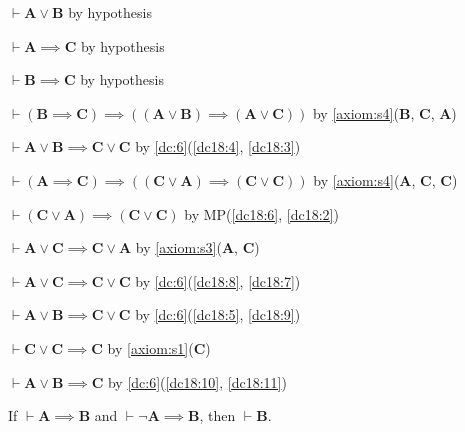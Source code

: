 \documentclass{amsart}%
\newcommand\metavariable[1]{\boldsymbol{#1}}
\begin{document}
\begin{pf}
\item\label{dc18:1} $\vdash\metavariable{A}\lor\metavariable{B}$ by hypothesis
\item\label{dc18:2} $\vdash\metavariable{A}\implies\metavariable{C}$ by hypothesis
\item\label{dc18:3} $\vdash\metavariable{B}\implies\metavariable{C}$ by hypothesis
\item\label{dc18:4} $\vdash(\metavariable{B}\implies\metavariable{C})\implies((\metavariable{A}\lor\metavariable{B})\implies(\metavariable{A}\lor\metavariable{C}))$
  by \ref{axiom:s4}($\metavariable{B}$, $\metavariable{C}$, $\metavariable{A}$)
\item\label{dc18:5} $\vdash\metavariable{A}\lor\metavariable{B}\implies\metavariable{C}\lor\metavariable{C}$
  by \ref{dc:6}(\ref{dc18:4}, \ref{dc18:3})
\item\label{dc18:6} $\vdash(\metavariable{A}\implies\metavariable{C})\implies((\metavariable{C}\lor\metavariable{A})\implies(\metavariable{C}\lor\metavariable{C}))$
  by \ref{axiom:s4}($\metavariable{A}$, $\metavariable{C}$, $\metavariable{C}$)
\item\label{dc18:7} $\vdash(\metavariable{C}\lor\metavariable{A})\implies(\metavariable{C}\lor\metavariable{C})$
  by MP(\ref{dc18:6}, \ref{dc18:2})
\item\label{dc18:8} $\vdash\metavariable{A}\lor\metavariable{C}\implies\metavariable{C}\lor\metavariable{A}$
  by \ref{axiom:s3}($\metavariable{A}$, $\metavariable{C}$)
\item\label{dc18:9} $\vdash\metavariable{A}\lor\metavariable{C}\implies\metavariable{C}\lor\metavariable{C}$
  by \ref{dc:6}(\ref{dc18:8}, \ref{dc18:7})
\item\label{dc18:10} $\vdash\metavariable{A}\lor\metavariable{B}\implies\metavariable{C}\lor\metavariable{C}$
  by \ref{dc:6}(\ref{dc18:5}, \ref{dc18:9})
\item\label{dc18:11} $\vdash\metavariable{C}\lor\metavariable{C}\implies\metavariable{C}$
  by \ref{axiom:s1}($\metavariable{C}$)
\item\label{dc18:12} $\vdash\metavariable{A}\lor\metavariable{B}\implies\metavariable{C}$
  by \ref{dc:6}(\ref{dc18:10}, \ref{dc18:11})
\end{pf}

\begin{corollary}
If $\vdash\metavariable{A}\implies\metavariable{B}$ and $\vdash\neg\metavariable{A}\implies\metavariable{B}$,
then $\vdash\metavariable{B}$.
\end{corollary}
\end{document}
